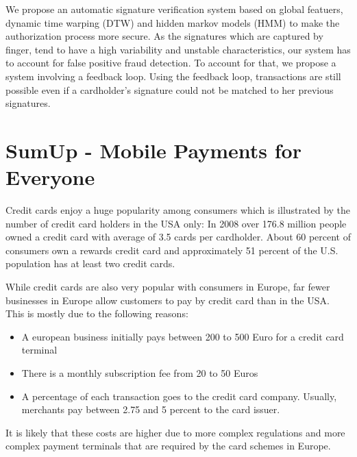 \documentclass[a4paper, oneside]{csthesis}
\begin{document}
We propose an automatic signature verification system based on global featuers, dynamic time warping (DTW) and hidden markov models (HMM) to make the authorization process more secure. As the signatures which are captured by finger, tend to have a high variability and unstable characteristics, our system has to account for false positive fraud detection. To account for that, we propose a system involving a feedback loop. Using the feedback loop, transactions are still possible even if a cardholder's signature could not be matched to her previous signatures.





\section{SumUp - Mobile Payments for Everyone}
\label{intro-sumup}

Credit cards enjoy a huge popularity among consumers which is illustrated by the number of credit card holders in the USA only: In 2008 over 176.8 million people owned a credit card with average of 3.5 cards per cardholder. About 60 percent of consumers own a rewards credit card and approximately 51 percent of the U.S. population has at least two credit cards.\cite{woolsey2010credit}

While credit cards are also very popular with consumers in Europe, far fewer businesses in Europe allow customers to pay by credit card than in the USA. This is mostly due to the following reasons:
\begin{itemize}
\item A european business initially pays between 200 to 500 Euro for a credit card terminal
\item There is a monthly subscription fee from 20 to 50 Euros
\item A percentage of each transaction goes to the credit card company. Usually, merchants pay between 2.75 and 5 percent to the card issuer.
\end{itemize}

It is likely that these costs are higher due to more complex regulations and more complex payment terminals that are required by the card schemes in Europe.
\end{document}
